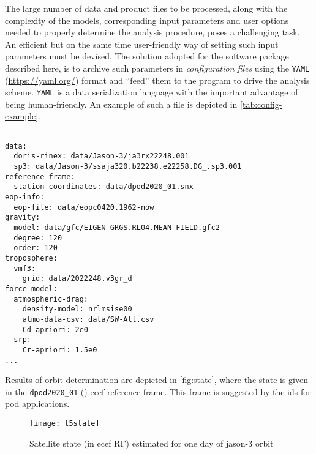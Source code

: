 The large number of data and product files to be processed, along with the complexity of 
the models, corresponding input parameters and user options needed to properly determine 
the analysis procedure, poses a challenging task. An efficient but on the same time 
user-friendly way of setting such input parameters must be devised. The solution adopted 
for the software package described here, is to archive such parameters in \emph{configuration files} 
using the \texttt{YAML} (\url{https://yaml.org/}) format and ``feed'' them to the 
program to drive the analysis scheme. \texttt{YAML} is a data serialization
language with the important advantage of being human-friendly. An example of such 
a file is depicted in \autoref{tab:config-example}.

\begin{adjustbox}{center, max width=\linewidth , fbox=0.5pt, captionbelow={Configuration file example.}, float=table}
\begin{BVerbatim}
---
data:
  doris-rinex: data/Jason-3/ja3rx22248.001
  sp3: data/Jason-3/ssaja320.b22238.e22258.DG_.sp3.001
reference-frame:
  station-coordinates: data/dpod2020_01.snx
eop-info:
  eop-file: data/eopc0420.1962-now
gravity:
  model: data/gfc/EIGEN-GRGS.RL04.MEAN-FIELD.gfc2
  degree: 120
  order: 120
troposphere:
  vmf3:
    grid: data/2022248.v3gr_d
force-model:
  atmospheric-drag:
    density-model: nrlmsise00
    atmo-data-csv: data/SW-All.csv
    Cd-apriori: 2e0
  srp:
    Cr-apriori: 1.5e0
...
\end{BVerbatim}
\label{tab:config-example}
\end{adjustbox}

Results of orbit determination are depicted in \autoref{fig:state}, where the state 
is given in the \texttt{dpod2020\_01} (\cite{Moreaux2023}) \gls{ecef} reference 
frame. This frame is suggested by the \gls{ids} for \gls{pod} applications.

\begin{figure}[ht]
    \centering
    \texttt{[image: t5state]}
    \caption{Satellite state (in \gls{ecef} RF) estimated for one day of \gls{jason}-3 orbit}
    \label{fig:state}
\end{figure}


